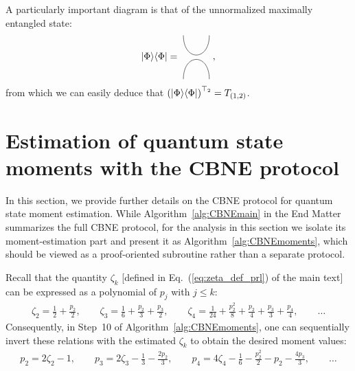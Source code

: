 \documentclass[aps,prl,twocolumn,nofootinbib,superscriptaddress,10pt]{revtex4-2}
\let\originalleft\left
\let\originalright\right
\renewcommand{\left}{\mathopen{}\mathclose\bgroup\originalleft}
\renewcommand{\right}{\aftergroup\egroup\originalright}
\def\>{\rangle}
\def\<{\langle}
\theoremstyle{plain}
\theoremstyle{definition}
\newcommand{\xratio}{1.2}%
\newcommand{\eref}[1]{Eq.~\textup{(\ref{#1})}}
\begin{document}
A particularly important diagram is that of the unnormalized maximally entangled state:  
\begin{align}
	|\Phi\>\<\Phi|=\ 
	\begin{tikzpicture}[baseline={([yshift=-.5ex]current bounding box.center)},inner sep=-4mm]
		\draw[-,draw=black] (-0.4*\xratio, 0.8) .. controls (-0.4*\xratio,-0.16) and (0.4*\xratio,-0.16) ..  (0.4*\xratio, 0.8);
		\draw[-,draw=black] (-0.4*\xratio,-0.8) .. controls (-0.4*\xratio, 0.16) and (0.4*\xratio, 0.16) ..  (0.4*\xratio,-0.8);
	\end{tikzpicture}\ , 
\end{align}
from which we can easily deduce that $\left( |\Phi\>\<\Phi|\right)^{\top_2}=T_{(1,2)}$. 
\fi



\section{Estimation of quantum state moments with  the CBNE protocol}\label{sec:momentCBNE}


In this section, we provide further details on the CBNE protocol for quantum state moment estimation. While Algorithm~\ref{alg:CBNEmain} in the End Matter summarizes the full CBNE protocol, for the analysis in this section we isolate its moment-estimation part and present it as Algorithm~\ref{alg:CBNEmoments}, which should be viewed as a proof-oriented subroutine rather than a separate protocol.




Recall that the quantity $\zeta_k$ [defined in \eref{eq:zeta_def_prl} of the main text] can be expressed as a polynomial of $p_j$ with $j\leq k$: 
\begin{align}\label{eq:zetaExpan}
\zeta_2= \frac{1}{2}+\frac{p_2}{2}, 
\qquad  
\zeta_3= \frac{1}{6}+\frac{p_2}{3}+\frac{p_3}{2},
\qquad 
\zeta_4= \frac{1}{24}+\frac{p_2^2}{8}+\frac{p_2}{4}+\frac{p_3}{3}+\frac{p_4}{4}, \qquad \dots  
\end{align}
Consequently, in Step~10 of Algorithm~\ref{alg:CBNEmoments}, one can sequentially invert these relations with the estimated $\zeta_k$ to obtain the desired moment values: 
\begin{align}
p_2= 2\zeta_2-1, 
\qquad
p_3= 2\zeta_3-\frac{1}{3}-\frac{2p_2}{3}, 
\qquad
p_4= 4\zeta_4- \frac{1}{6}-\frac{p_2^2}{2}-p_2-\frac{4p_3}{3},
\qquad \dots   
\end{align}
\end{document}
